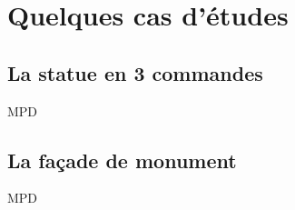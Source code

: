 \section{Quelques cas d'études}
\subsection{La statue en 3 commandes}
MPD
\subsection{La façade de monument}
MPD